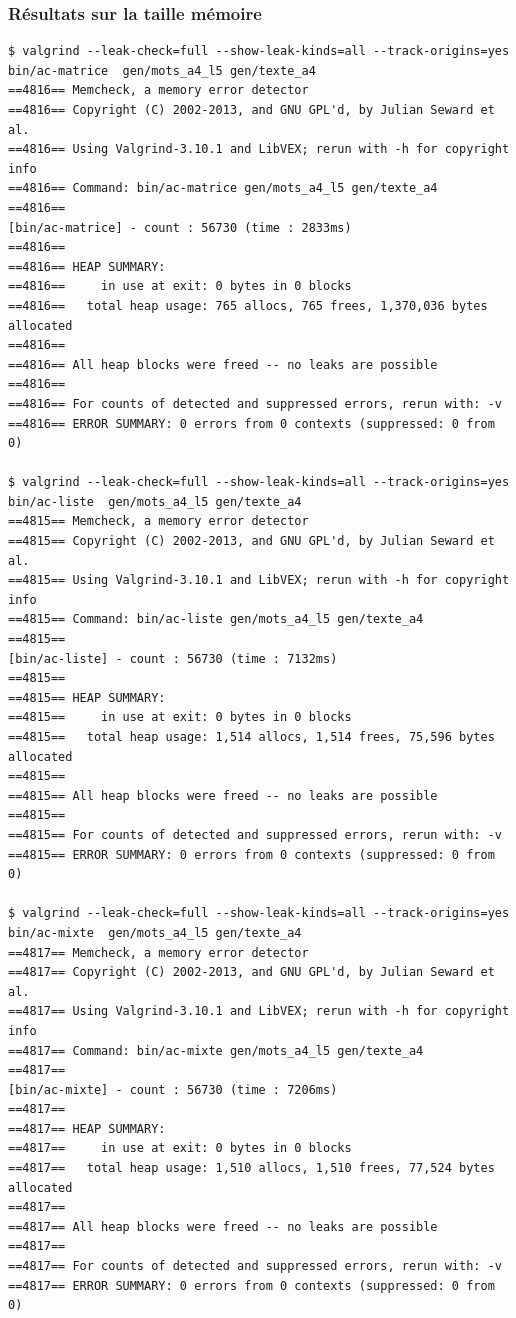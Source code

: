\begin{spacing}{1.5}
\begin{spacing}{1.5}
\begin{spacing}{1.5}
\subsubsection*{Résultats sur la taille mémoire}

\begin{verbatim}
$ valgrind --leak-check=full --show-leak-kinds=all --track-origins=yes
bin/ac-matrice  gen/mots_a4_l5 gen/texte_a4
==4816== Memcheck, a memory error detector
==4816== Copyright (C) 2002-2013, and GNU GPL'd, by Julian Seward et al.
==4816== Using Valgrind-3.10.1 and LibVEX; rerun with -h for copyright info
==4816== Command: bin/ac-matrice gen/mots_a4_l5 gen/texte_a4
==4816==
[bin/ac-matrice] - count : 56730 (time : 2833ms)
==4816==
==4816== HEAP SUMMARY:
==4816==     in use at exit: 0 bytes in 0 blocks
==4816==   total heap usage: 765 allocs, 765 frees, 1,370,036 bytes allocated
==4816==
==4816== All heap blocks were freed -- no leaks are possible
==4816==
==4816== For counts of detected and suppressed errors, rerun with: -v
==4816== ERROR SUMMARY: 0 errors from 0 contexts (suppressed: 0 from 0)

$ valgrind --leak-check=full --show-leak-kinds=all --track-origins=yes
bin/ac-liste  gen/mots_a4_l5 gen/texte_a4
==4815== Memcheck, a memory error detector
==4815== Copyright (C) 2002-2013, and GNU GPL'd, by Julian Seward et al.
==4815== Using Valgrind-3.10.1 and LibVEX; rerun with -h for copyright info
==4815== Command: bin/ac-liste gen/mots_a4_l5 gen/texte_a4
==4815==
[bin/ac-liste] - count : 56730 (time : 7132ms)
==4815==
==4815== HEAP SUMMARY:
==4815==     in use at exit: 0 bytes in 0 blocks
==4815==   total heap usage: 1,514 allocs, 1,514 frees, 75,596 bytes allocated
==4815==
==4815== All heap blocks were freed -- no leaks are possible
==4815==
==4815== For counts of detected and suppressed errors, rerun with: -v
==4815== ERROR SUMMARY: 0 errors from 0 contexts (suppressed: 0 from 0)

$ valgrind --leak-check=full --show-leak-kinds=all --track-origins=yes
bin/ac-mixte  gen/mots_a4_l5 gen/texte_a4
==4817== Memcheck, a memory error detector
==4817== Copyright (C) 2002-2013, and GNU GPL'd, by Julian Seward et al.
==4817== Using Valgrind-3.10.1 and LibVEX; rerun with -h for copyright info
==4817== Command: bin/ac-mixte gen/mots_a4_l5 gen/texte_a4
==4817==
[bin/ac-mixte] - count : 56730 (time : 7206ms)
==4817==
==4817== HEAP SUMMARY:
==4817==     in use at exit: 0 bytes in 0 blocks
==4817==   total heap usage: 1,510 allocs, 1,510 frees, 77,524 bytes allocated
==4817==
==4817== All heap blocks were freed -- no leaks are possible
==4817==
==4817== For counts of detected and suppressed errors, rerun with: -v
==4817== ERROR SUMMARY: 0 errors from 0 contexts (suppressed: 0 from 0)
\end{verbatim}


\end{spacing}
\end{spacing}
\end{spacing}
